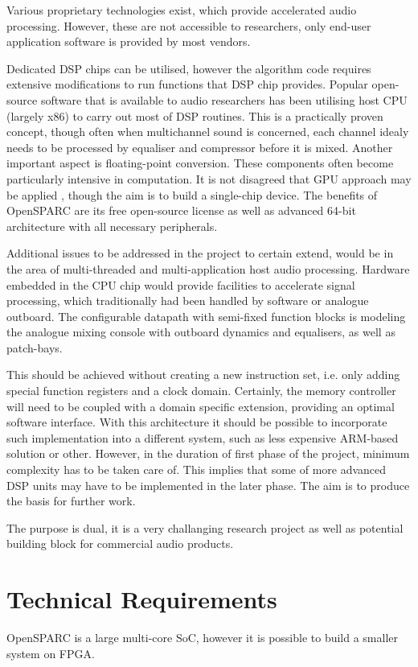 \documentclass[twocolumn]{article}
\begin{document}
  Various proprietary technologies exist, which provide accelerated
  audio processing. However, these are not accessible to researchers,
  only end-user application software is provided by most vendors.


  Dedicated DSP chips can be utilised, however the algorithm code
  requires extensive modifications to run functions that DSP chip
  provides. Popular open-source software that is available to audio
  researchers \cite{wiki:pd,wiki:sc,wiki:cs} has been utilising host
  CPU (largely x86) to carry out most of DSP routines. This is a
  practically proven concept, though often when multichannel sound
  is concerned, each channel idealy needs to be processed by equaliser
  and compressor before it is mixed. Another important aspect is
  floating-point conversion. These components often become particularly
  intensive in computation. It is not disagreed that GPU approach may
  be applied \cite{moore2009the,savioja2010real,tsingos2009using},
  though the aim is to build a single-chip device.
  The benefits of OpenSPARC are its free open-source license as well
  as advanced 64-bit architecture with all necessary peripherals.

  Additional issues to be addressed in the project to certain extend,
  would be in the area of multi-threaded and multi-application host
  audio processing. Hardware embedded in the CPU chip would provide
  facilities to accelerate signal processing, which traditionally
  had been handled by software or analogue outboard. The configurable
  datapath with semi-fixed function blocks is modeling the analogue
  mixing console with outboard dynamics and equalisers, as well as
  patch-bays.

  This should be achieved without creating a new instruction set,
  i.e. only adding special function registers and a clock domain.
  Certainly, the memory controller will need to be coupled with
  a domain specific extension, providing an optimal software
  interface. With this architecture it should be possible to 
  incorporate such implementation into a different system,
  such as less expensive ARM-based solution or other.
  However, in the duration of first phase of the project, minimum
  complexity has to be taken care of. This implies that some of
  more advanced DSP units may have to be implemented in the later
  phase. The aim is to produce the basis for further work. 
  
  The purpose is dual, it is a very challanging research project
  as well as potential building block for commercial audio products.

\section{Technical Requirements}

  OpenSPARC is a large multi-core SoC, however it is possible
  to build a smaller system \cite{site:oc:S1} on FPGA.
  




\end{document}
